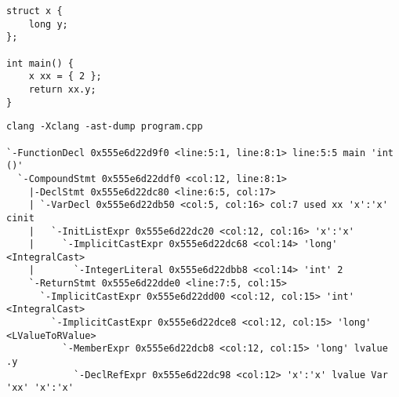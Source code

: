 	        \begin{lstlisting}[label={lst:ast-lower-after-ast}]
struct x {
	long y;
};

int main() {
	x xx = { 2 };
	return xx.y;
}
			\end{lstlisting}

	        \begin{lstlisting}[label={lst:ast-lower-after-ast}]
clang -Xclang -ast-dump program.cpp

`-FunctionDecl 0x555e6d22d9f0 <line:5:1, line:8:1> line:5:5 main 'int ()'
  `-CompoundStmt 0x555e6d22ddf0 <col:12, line:8:1>
	|-DeclStmt 0x555e6d22dc80 <line:6:5, col:17>
	| `-VarDecl 0x555e6d22db50 <col:5, col:16> col:7 used xx 'x':'x' cinit
	|   `-InitListExpr 0x555e6d22dc20 <col:12, col:16> 'x':'x'
	|     `-ImplicitCastExpr 0x555e6d22dc68 <col:14> 'long' <IntegralCast>
	|       `-IntegerLiteral 0x555e6d22dbb8 <col:14> 'int' 2
	`-ReturnStmt 0x555e6d22dde0 <line:7:5, col:15>
	  `-ImplicitCastExpr 0x555e6d22dd00 <col:12, col:15> 'int' <IntegralCast>
	    `-ImplicitCastExpr 0x555e6d22dce8 <col:12, col:15> 'long' <LValueToRValue>
	      `-MemberExpr 0x555e6d22dcb8 <col:12, col:15> 'long' lvalue .y
	        `-DeclRefExpr 0x555e6d22dc98 <col:12> 'x':'x' lvalue Var 'xx' 'x':'x'
			\end{lstlisting}
